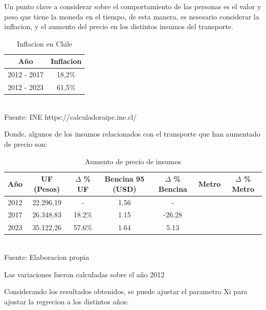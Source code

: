 \documentclass[12pt]{article} %
\begin{document}
Un punto clave a considerar sobre el comportamiento de las personas es el valor y peso que tiene la moneda en el tiempo, de esta manera, es nesesario considerar la inflacion, y el aumento del precio en los distintos insumos del transporte.

\begin{table}[H]
    \centering
    \caption{Inflacion en Chile}
    \vspace{0.2cm}
    \begin{tabular}{|c|c|}
        \hline
        Año & Inflacion \\
        \hline
        2012 - 2017 & 18,2\% \\
        2012 - 2023 & 61,5\% \\
        \hline
    \end{tabular}
    \vspace{0.2cm}
    \\Fuente: INE https://calculadoraipc.ine.cl/
\end{table}

Donde, algunos de los insumos relacionados con el transporte que han aumentado de precio son:

\begin{table}[H]
    \centering
    \caption{Aumento de precio de insumos}
    \vspace{0.2cm}
    \begin{tabular}{|c|c|c|c|c|c|c|}
        \hline
        Año & UF (Pesos) & $\Delta$ \% UF & Bencina 95 (USD) & $\Delta$ \% Bencina & Metro & $\Delta$ \% Metro\\
        \hline
        2012 & 22.296,19 & - & 1.56  & - & & \\
        2017 & 26.348,83 & 18.2\% & 1.15 & -26.28 & & \\
        2023 & 35.122,26 & 57.6\% & 1.64 & 5.13 & & \\
        \hline
    \end{tabular}
    \vspace{0.2cm}
    \\Fuente: Elaboracion propia
\end{table}

Las variaciones fueron calculadas sobre el año 2012


Considerando los resultados obtenidos, se puede ajustar el parametro Xi para ajustar la regrecion a los distintos años:
\end{document}
